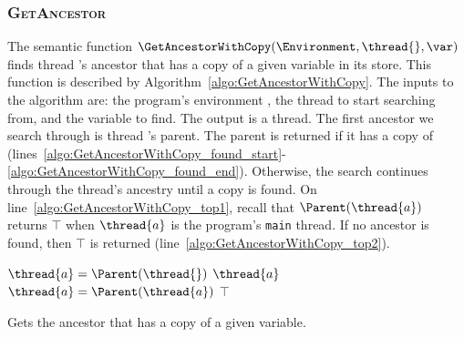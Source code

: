 \subsubsection{\textsc{GetAncestor}}
\label{sec:forec_GetAncestorWithCopy}
The semantic function $\GetAncestorWithCopy(\Environment, \thread{}, \var)$ 
finds thread \thread{}'s ancestor that has a copy 
of a given variable \var{} in its store. This function is described 
by Algorithm~\ref{algo:GetAncestorWithCopy}. The inputs
to the algorithm are: the program's environment 
\Environment{}, the thread \thread{} to start searching 
from, and the variable \var{} to find. The output is a
thread. The first ancestor we search through is thread 
\thread{}'s parent. The parent is returned if it has a 
copy of \var{} (lines~\ref{algo:GetAncestorWithCopy_found_start}-\ref{algo:GetAncestorWithCopy_found_end}). 
Otherwise, the search continues 
through the thread's ancestry until a copy is found. On
line~\ref{algo:GetAncestorWithCopy_top1}, recall that 
$\Parent(\thread{a})$ returns $\top$ when $\thread{a}$ is 
the program's \verb$main$ thread. If no ancestor is found, 
then $\top$ is returned (line~\ref{algo:GetAncestorWithCopy_top2}).

\begin{algorithm}[t]
	\begin{algorithmic}[1]
		\Function{$\GetAncestorWithCopy$}{\Environment{}, \thread{}, \var{}}
			\State $\thread{a} = \Parent(\thread{})$		
								
				\If {$\var \in \Environment[\thread{a}]$}	\label{algo:GetAncestorWithCopy_found_start}
					\State \Return $\thread{a}$				
				\EndIf										\label{algo:GetAncestorWithCopy_found_end}
				\State $\thread{a} = \Parent(\thread{a})$	\label{algo:GetAncestorWithCopy_top1}
			\EndWhile
			\State \Return $\top$							\label{algo:GetAncestorWithCopy_top2}
		\EndFunction
	\end{algorithmic}
	
	\caption{Gets the ancestor that has a copy of a given variable.}
	\label{algo:GetAncestorWithCopy}
\end{algorithm}

